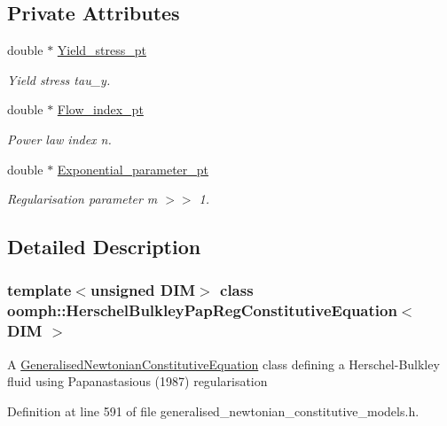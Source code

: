 \subsection*{Private Attributes}
\begin{DoxyCompactItemize}
\item 
double $\ast$ \hyperlink{classoomph_1_1HerschelBulkleyPapRegConstitutiveEquation_af7b655416d6dc2816df7f16ac0b1f62f}{Yield\+\_\+stress\+\_\+pt}
\begin{DoxyCompactList}\small\item\em Yield stress tau\+\_\+y. \end{DoxyCompactList}\item 
double $\ast$ \hyperlink{classoomph_1_1HerschelBulkleyPapRegConstitutiveEquation_acc7d50e74df9fa24a0cb8000484c4742}{Flow\+\_\+index\+\_\+pt}
\begin{DoxyCompactList}\small\item\em Power law index n. \end{DoxyCompactList}\item 
double $\ast$ \hyperlink{classoomph_1_1HerschelBulkleyPapRegConstitutiveEquation_ad21182de6f65351e6dcac6e288ecc51d}{Exponential\+\_\+parameter\+\_\+pt}
\begin{DoxyCompactList}\small\item\em Regularisation parameter m $>$$>$ 1. \end{DoxyCompactList}\end{DoxyCompactItemize}


\subsection{Detailed Description}
\subsubsection*{template$<$unsigned D\+IM$>$\newline
class oomph\+::\+Herschel\+Bulkley\+Pap\+Reg\+Constitutive\+Equation$<$ D\+I\+M $>$}

A \hyperlink{classoomph_1_1GeneralisedNewtonianConstitutiveEquation}{Generalised\+Newtonian\+Constitutive\+Equation} class defining a Herschel-\/\+Bulkley fluid using Papanastasiou\textquotesingle{}s (1987) regularisation 

Definition at line 591 of file generalised\+\_\+newtonian\+\_\+constitutive\+\_\+models.\+h.



